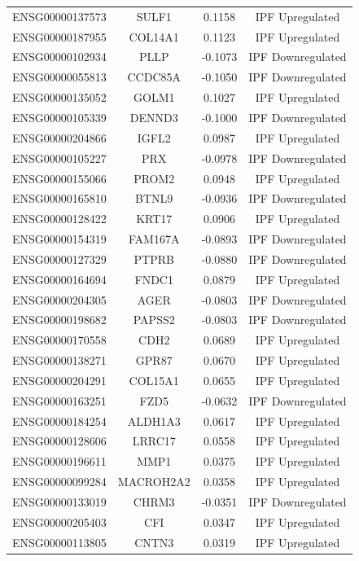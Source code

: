 \documentclass[
]{article}
\begin{document}
\begin{singlespace}
\begin{longtable}[t]{lccc}
ENSG00000137573 & SULF1 & 0.1158 & IPF Upregulated\\
ENSG00000187955 & COL14A1 & 0.1123 & IPF Upregulated\\
\addlinespace
ENSG00000102934 & PLLP & -0.1073 & IPF Downregulated\\
ENSG00000055813 & CCDC85A & -0.1050 & IPF Downregulated\\
ENSG00000135052 & GOLM1 & 0.1027 & IPF Upregulated\\
ENSG00000105339 & DENND3 & -0.1000 & IPF Downregulated\\
ENSG00000204866 & IGFL2 & 0.0987 & IPF Upregulated\\
\addlinespace
ENSG00000105227 & PRX & -0.0978 & IPF Downregulated\\
ENSG00000155066 & PROM2 & 0.0948 & IPF Upregulated\\
ENSG00000165810 & BTNL9 & -0.0936 & IPF Downregulated\\
ENSG00000128422 & KRT17 & 0.0906 & IPF Upregulated\\
ENSG00000154319 & FAM167A & -0.0893 & IPF Downregulated\\
\addlinespace
ENSG00000127329 & PTPRB & -0.0880 & IPF Downregulated\\
ENSG00000164694 & FNDC1 & 0.0879 & IPF Upregulated\\
ENSG00000204305 & AGER & -0.0803 & IPF Downregulated\\
ENSG00000198682 & PAPSS2 & -0.0803 & IPF Downregulated\\
ENSG00000170558 & CDH2 & 0.0689 & IPF Upregulated\\
\addlinespace
ENSG00000138271 & GPR87 & 0.0670 & IPF Upregulated\\
ENSG00000204291 & COL15A1 & 0.0655 & IPF Upregulated\\
ENSG00000163251 & FZD5 & -0.0632 & IPF Downregulated\\
ENSG00000184254 & ALDH1A3 & 0.0617 & IPF Upregulated\\
ENSG00000128606 & LRRC17 & 0.0558 & IPF Upregulated\\
\addlinespace
ENSG00000196611 & MMP1 & 0.0375 & IPF Upregulated\\
ENSG00000099284 & MACROH2A2 & 0.0358 & IPF Upregulated\\
ENSG00000133019 & CHRM3 & -0.0351 & IPF Downregulated\\
ENSG00000205403 & CFI & 0.0347 & IPF Upregulated\\
ENSG00000113805 & CNTN3 & 0.0319 & IPF Upregulated\\

\end{longtable}
\end{singlespace}
\end{document}
